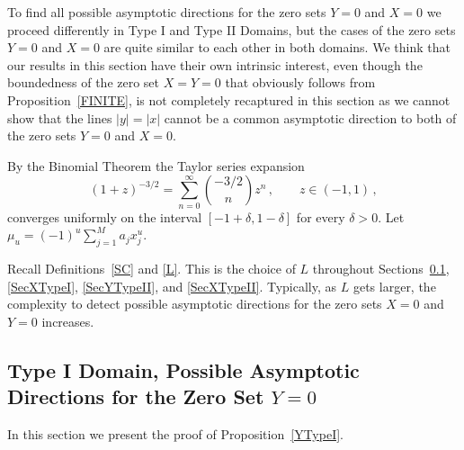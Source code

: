 \documentclass{article}
\theoremstyle{remark}
\numberwithin{equation}{section}
\begin{document}
\noindent To find all possible asymptotic directions for the zero sets $Y=0$ and $X=0$ we proceed differently in Type I and Type II Domains, but the cases of 
the zero sets $Y=0$ and $X=0$ are quite similar to each other in both domains.  
We think that our results in this section have their own intrinsic interest, even though the boundedness of the zero set $X=Y=0$ that obviously follows from 
Proposition~\ref{FINITE}, is not completely recaptured in this section as we cannot show that the lines $|y|=|x|$ cannot be a common asymptotic direction 
to both of the zero sets $Y=0$ and $X=0$. 

By the Binomial Theorem the Taylor series expansion
$$(1+z)^{-3/2} = \sum_{n=0}^\infty{\binom {-3/2}{n}{z^n}}\,, \qquad z \in (-1,1)\,,$$
converges uniformly on the interval $[-1+\delta,1-\delta]$ for every $\delta > 0$.
Let $\mu_u = (-1)^u \sum_{j=1}^M{a_jx_j^u}$.

Recall Definitions~\ref{SC} and \ref{L}. 
This is the choice of $L$ throughout Sections~\ref{SecYTypeI}, \ref{SecXTypeI}, \ref{SecYTypeII}, and \ref{SecXTypeII}. Typically, as $L$ gets larger, 
the complexity to detect possible asymptotic directions for the zero sets $X=0$ and $Y=0$ increases.

\subsection{Type I Domain, Possible Asymptotic Directions for the Zero Set $Y=0$}\label{SecYTypeI}

In this section we present the proof of Proposition~\ref{YTypeI}.
\end{document}
